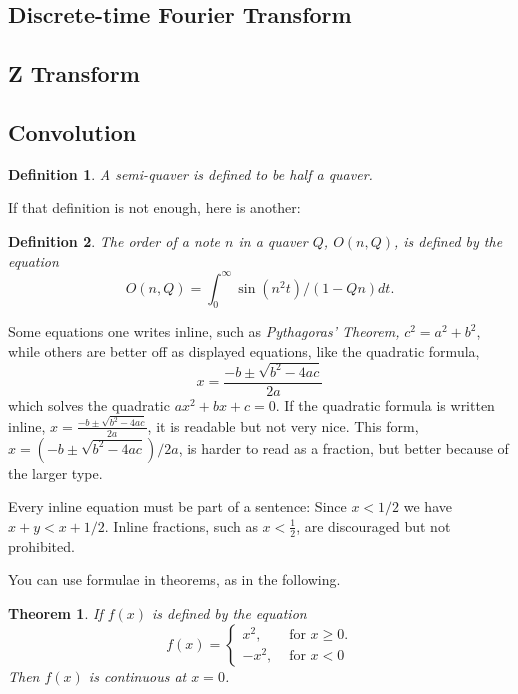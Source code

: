 \documentclass{article}
\newtheorem{theorem}{Theorem}
\newtheorem{definition}{Definition}
\begin{document}
\subsection{Discrete-time Fourier Transform}
\subsection{Z Transform}
\subsection{Convolution}

\begin{definition}
     A {\em semi-quaver} is defined to be half a quaver.
\end{definition}

If that definition is not enough, here is another:

\begin{definition}
    The {\em order} of a note $n$ in a quaver $Q$,
    $O(n,Q)$, is defined by the equation
         $$ O(n,Q) = \int_{0}^{\infty} \sin(n^{2} t)/(1-Qn) dt. $$
\end{definition}

Some equations one writes inline, such as
{\em Pythagoras' Theorem,}
$c^{2} = a^{2} + b^{2}$,
while others are better off as displayed
equations, like the quadratic formula,
  $$x = \frac{-b \pm \sqrt{b^{2} - 4ac}}{2a}$$
which solves the quadratic $ax^{2} + bx + c = 0$. If the quadratic
formula is written inline,
  $x = \frac{-b \pm \sqrt{b^{2} - 4ac}}{2a}$,
it is readable but not very nice.
This form,
  $x = (-b \pm \sqrt{b^{2} - 4ac})/2a$,
is harder to read as a fraction, but better because of the larger type.

Every inline equation must be part of a sentence:  Since $x < 1/2$ we have
$x + y < x + 1/2$.  Inline fractions, such as $x < \frac{1}{2}$, are discouraged but
not prohibited.


You can use formulae in theorems, as in the following.

\begin{theorem}\label{ContThrm}
    If $f(x)$ is defined by the equation
    \begin{equation}\label{SplitFunc}
         f(x) = \left\{ \begin{array}{rl}
                          x^{2}, & \mbox{~for $x \geq 0$.} \\
                         -x^{2}, & \mbox{~for $x < 0$}
                         \end{array} \right.
   \end{equation}
   Then $f(x)$ is continuous at $x=0$.
\end{theorem}
\end{document}
